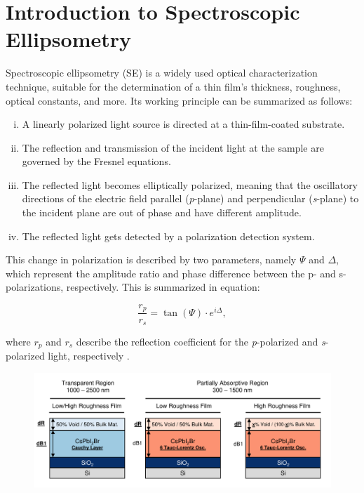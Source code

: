 \section{Introduction to Spectroscopic Ellipsometry} \label{ch:ellipsometry:intro}


Spectroscopic ellipsometry (SE) is a widely used optical characterization technique, suitable for the determination of a thin film's thickness, roughness, optical constants, and more. Its working principle can be summarized as follows: 

\begin{enumerate}[i.]
  \item A linearly polarized light source is directed at a thin-film-coated substrate.
  \item The reflection and transmission of the incident light at the sample are governed by the Fresnel equations.
  \item The reflected light becomes elliptically polarized, meaning that the oscillatory directions of the electric field parallel (\textit{p}-plane) and perpendicular (\textit{s}-plane) to the incident plane are out of phase and have different amplitude.
  \item The reflected light gets detected by a polarization detection system.
\end{enumerate}

This change in polarization is described by two parameters, namely $\Psi$ and $\Delta$, which represent the amplitude ratio and phase difference between the p- and s-polarizations, respectively. This is summarized in equation: 

\begin{equation}
\frac{r_p}{r_s} = \tan(\Psi) \cdot e^{i\Delta},
\label{eq:ellipsometry}
\end{equation}

where $r_p$ and $r_s$ describe the reflection coefficient for the \textit{p}-polarized and \textit{s}-polarized light, respectively \cite{Fujiwara2018SpectroscopicCharacterization}.

\begin{figure}{}
  \centering
  \medskip
  \includegraphics[width=.95\textwidth]{chapters/ellipsometry/image/Model_Approach.pdf}
  \caption{}
  \label{fig:ellipsometry:static_models}
\end{figure}


